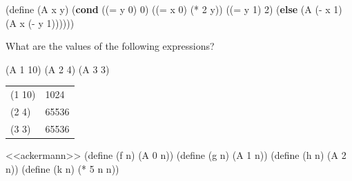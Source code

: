 \documentclass[
]{article}
\newenvironment{Shaded}{}{}
\newcommand{\DecValTok}[1]{\textcolor[rgb]{0.25,0.63,0.44}{#1}}
\newcommand{\ExtensionTok}[1]{#1}
\newcommand{\FunctionTok}[1]{\textcolor[rgb]{0.02,0.16,0.49}{#1}}
\newcommand{\KeywordTok}[1]{\textcolor[rgb]{0.00,0.44,0.13}{\textbf{#1}}}
\newcommand{\NormalTok}[1]{#1}
\newcommand{\OperatorTok}[1]{\textcolor[rgb]{0.40,0.40,0.40}{#1}}
\begin{document}
\hypertarget{ackermann}{%
\label{ackermann}}%
\begin{Shaded}
\begin{Highlighting}[numbers=left,,]
\NormalTok{(}\ExtensionTok{define}\FunctionTok{ }\NormalTok{(A x y)}
\NormalTok{  (}\KeywordTok{cond}\NormalTok{ ((}\OperatorTok{=}\NormalTok{ y }\DecValTok{0}\NormalTok{) }\DecValTok{0}\NormalTok{)}
\NormalTok{        ((}\OperatorTok{=}\NormalTok{ x }\DecValTok{0}\NormalTok{) (}\OperatorTok{*} \DecValTok{2}\NormalTok{ y))}
\NormalTok{        ((}\OperatorTok{=}\NormalTok{ y }\DecValTok{1}\NormalTok{) }\DecValTok{2}\NormalTok{)}
\NormalTok{        (}\KeywordTok{else}\NormalTok{ (A (}\OperatorTok{{-}}\NormalTok{ x }\DecValTok{1}\NormalTok{)}
\NormalTok{                 (A x (}\OperatorTok{{-}}\NormalTok{ y }\DecValTok{1}\NormalTok{))))))}
\end{Highlighting}
\end{Shaded}

What are the values of the following expressions?

\begin{Shaded}
\begin{Highlighting}[numbers=left,,]
\NormalTok{(A }\DecValTok{1} \DecValTok{10}\NormalTok{)}
\NormalTok{(A }\DecValTok{2} \DecValTok{4}\NormalTok{)}
\NormalTok{(A }\DecValTok{3} \DecValTok{3}\NormalTok{)}
\end{Highlighting}
\end{Shaded}

\begin{longtable}[]{@{}ll@{}}
\toprule
\endhead
(1 10) & 1024 \\
(2 4) & 65536 \\
(3 3) & 65536 \\
\bottomrule
\end{longtable}

\hypertarget{EX1-10-defs}{%
\label{EX1-10-defs}}%
\begin{Shaded}
\begin{Highlighting}[numbers=left,,]
\NormalTok{\textless{}\textless{}ackermann\textgreater{}\textgreater{}}
\NormalTok{(}\ExtensionTok{define}\FunctionTok{ }\NormalTok{(f n) (A }\DecValTok{0}\NormalTok{ n))}
\NormalTok{(}\ExtensionTok{define}\FunctionTok{ }\NormalTok{(g n) (A }\DecValTok{1}\NormalTok{ n))}
\NormalTok{(}\ExtensionTok{define}\FunctionTok{ }\NormalTok{(h n) (A }\DecValTok{2}\NormalTok{ n))}
\NormalTok{(}\ExtensionTok{define}\FunctionTok{ }\NormalTok{(k n) (}\OperatorTok{*} \DecValTok{5}\NormalTok{ n n))}
\end{Highlighting}
\end{Shaded}
\end{document}
